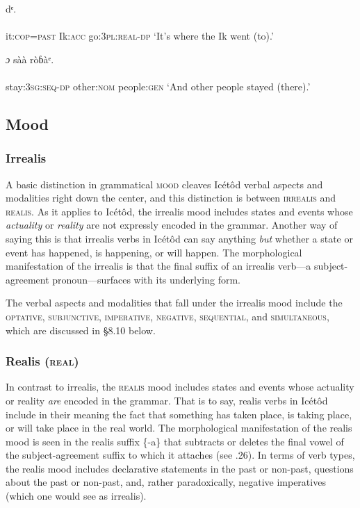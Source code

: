 \ea\label{ex:}
dᵉ. \\
    \\
it:\textsc{cop}=\textsc{past}    Ik:\textsc{acc}   go:\textsc{3pl:real-dp}
\glt ‘It’s where the Ik went (to).’ 
\z




\ea\label{ex:}
\textit{ɔ}     sàà     ròɓàᵉ. \\
    \\
stay:\textsc{3sg:seq-dp}   other:\textsc{nom}   people:\textsc{gen}
\glt ‘And other people stayed (there).’ 
\z






\subsection{Mood}
\subsubsection{Irrealis}

A basic distinction in grammatical \textsc{mood} cleaves Icétôd verbal aspects and modalities right down the center, and this distinction is between \textsc{irrealis} and \textsc{realis}. As it applies to Icétôd, the irrealis mood includes states and events whose \textit{actuality} or \textit{reality} are not expressly encoded in the grammar. Another way of saying this is that irrealis verbs in Icétôd can say anything \textit{but} whether a state or event has happened, is happening, or will happen. The morphological manifestation of the irrealis is that the final suffix of an irrealis verb—a subject-agreement pronoun—surfaces with its underlying form. 

The verbal aspects and modalities that fall under the irrealis mood include the \textsc{optative}, \textsc{subjunctive}, \textsc{imperative}, \textsc{negative}, \textsc{sequential}, and \textsc{simultaneous}, which are discussed in §8.10 below. 


\subsubsection{Realis (\textsc{real})}

In contrast to irrealis, the \textsc{realis} mood includes states and events whose actuality or reality \textit{are} encoded in the grammar. That is to say, realis verbs in Icétôd include in their meaning the fact that something has taken place, is taking place, or will take place in the real world. The morphological manifestation of the realis mood is seen in the realis suffix \{-a\} that subtracts or deletes the final vowel of the subject-agreement suffix to which it attaches (see .26). In terms of verb types, the realis mood includes declarative statements in the past or non-past, questions about the past or non-past, and, rather paradoxically, negative imperatives (which one would see as irrealis).




